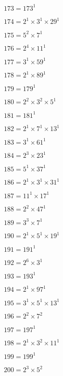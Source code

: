 $173 = 173^{1}$

$174 = 2^{1} × 3^{1} × 29^{1}$

$175 = 5^{2} × 7^{1}$

$176 = 2^{4} × 11^{1}$

$177 = 3^{1} × 59^{1}$

$178 = 2^{1} × 89^{1}$

$179 = 179^{1}$

$180 = 2^{2} × 3^{2} × 5^{1}$

$181 = 181^{1}$

$182 = 2^{1} × 7^{1} × 13^{1}$

$183 = 3^{1} × 61^{1}$

$184 = 2^{3} × 23^{1}$

$185 = 5^{1} × 37^{1}$

$186 = 2^{1} × 3^{1} × 31^{1}$

$187 = 11^{1} × 17^{1}$

$188 = 2^{2} × 47^{1}$

$189 = 3^{3} × 7^{1}$

$190 = 2^{1} × 5^{1} × 19^{1}$

$191 = 191^{1}$

$192 = 2^{6} × 3^{1}$

$193 = 193^{1}$

$194 = 2^{1} × 97^{1}$

$195 = 3^{1} × 5^{1} × 13^{1}$

$196 = 2^{2} × 7^{2}$

$197 = 197^{1}$

$198 = 2^{1} × 3^{2} × 11^{1}$

$199 = 199^{1}$

$200 = 2^{3} × 5^{2}$

